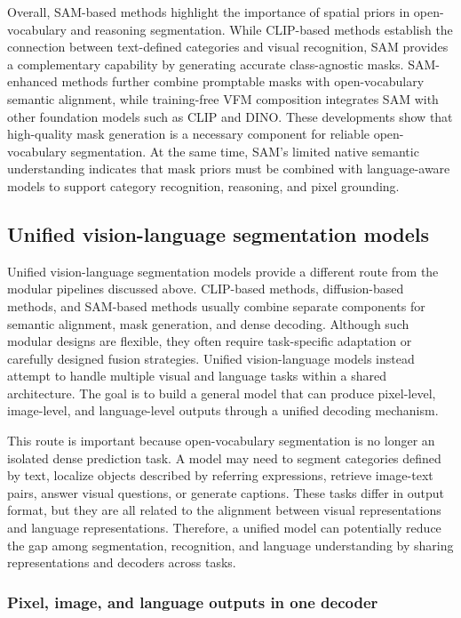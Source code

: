 Overall, SAM-based methods highlight the importance of spatial priors in open-vocabulary and reasoning segmentation. 
While CLIP-based methods establish the connection between text-defined categories and visual recognition, SAM provides a complementary capability by generating accurate class-agnostic masks. 
SAM-enhanced methods further combine promptable masks with open-vocabulary semantic alignment, while training-free VFM composition integrates SAM with other foundation models such as CLIP and DINO. 
These developments show that high-quality mask generation is a necessary component for reliable open-vocabulary segmentation. 
At the same time, SAM's limited native semantic understanding indicates that mask priors must be combined with language-aware models to support category recognition, reasoning, and pixel grounding.

\subsection{Unified vision-language segmentation models}
\label{subsec:unified_vl_segmentation}

Unified vision-language segmentation models provide a different route from the modular pipelines discussed above. 
CLIP-based methods, diffusion-based methods, and SAM-based methods usually combine separate components for semantic alignment, mask generation, and dense decoding. 
Although such modular designs are flexible, they often require task-specific adaptation or carefully designed fusion strategies. 
Unified vision-language models instead attempt to handle multiple visual and language tasks within a shared architecture. 
The goal is to build a general model that can produce pixel-level, image-level, and language-level outputs through a unified decoding mechanism.

This route is important because open-vocabulary segmentation is no longer an isolated dense prediction task. 
A model may need to segment categories defined by text, localize objects described by referring expressions, retrieve image-text pairs, answer visual questions, or generate captions. 
These tasks differ in output format, but they are all related to the alignment between visual representations and language representations. 
Therefore, a unified model can potentially reduce the gap among segmentation, recognition, and language understanding by sharing representations and decoders across tasks.

\subsubsection{Pixel, image, and language outputs in one decoder}

